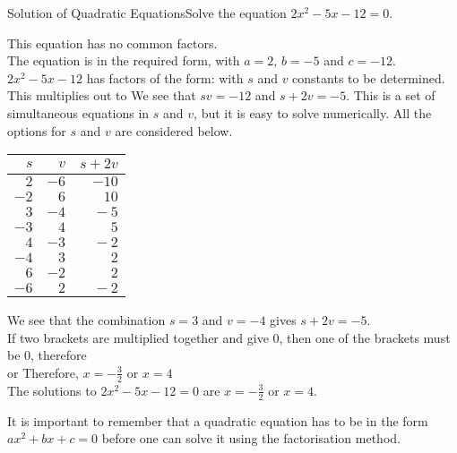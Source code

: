 \begin{wex}{Solution of Quadratic Equations}{Solve the equation $2x^{2} - 5x - 12 = 0$.\\}
{
This equation has no common factors.\\

The equation is in the required form, with $a=2$, $b=-5$ and $c=-12$.\\

$2x^{2} - 5x - 12$ has factors of the form:
with $s$ and $v$ constants to be determined.
This multiplies out to
We see that $sv = -12$ and $s + 2v = -5$. This is a set of simultaneous equations in $s$ and $v$, but it is easy to solve numerically. All the options for $s$ and $v$ are considered below.

\begin{center}
\begin{tabular}{|r|r|r|}\hline\hline
$~s$ & $~v$ & $s + 2v$ \\\hline\hline
$~2$ & $-6$ & $-10$ \\
$-2$ & $~6$ & $~10$ \\
$~3$ & $-4$ & $~-5$ \\
$-3$ & $~4$ & $~~5$ \\
$~4$ & $-3$ & $~-2$ \\
$-4$ & $~3$ & $~~2$ \\
$~6$ & $-2$ & $~~2$ \\
$-6$ & $~2$ & $~-2$ \\\hline
\end{tabular}
\end{center}
We see that the combination $s = 3$ and $v = -4$ gives $s + 2v = -5$.\\

If two brackets are multiplied together and give 0, then one of the brackets must be 0,  therefore\\
or
Therefore, $x=-\frac{3}{2}$ or $x=4$\\
The solutions to $2x^{2} - 5x - 12 = 0$ are $x=-\frac{3}{2}$ or $x=4$.
}\end{wex}

It is important to remember that a quadratic equation has to be in the form    $ax^2+bx+c = 0$ before one can solve it using the factorisation method.

